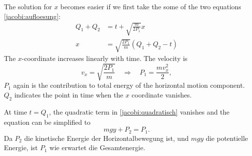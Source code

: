 The solution for $x$ becomes easier if we first take the some
of the two equations
\eqref{jacobi:aufloesung}:
\begin{align*}
Q_1+Q_2&=t+\sqrt{\frac{m}{2P_1}}x\\
x&=\sqrt{\frac{2P_1}{m}}(Q_1+Q_2-t)
\end{align*}
The $x$-coordinate increases linearly with time.
The velocity is
\[
v_x=\sqrt{\frac{2P_1}{m}}\quad\Rightarrow\quad P_1=\frac{mv_x^2}2,
\]
$P_1$ again is the contribution to total energy of the horizontal
motion component.
$Q_2$ indicates the point in time when the $x$ coordinate vanishes.

At time $t=Q_1$, the quadratic term in \eqref{jacobi:quadratisch} vanishes
and the equation can be simplified to
\[
mgy + P_2=P_1.
\]
Da $P_2$ die kinetische Energie der Horizontalbewegung ist, und $mgy$
die potentielle Energie, ist $P_1$ wie erwartet die Gesamtenergie.

